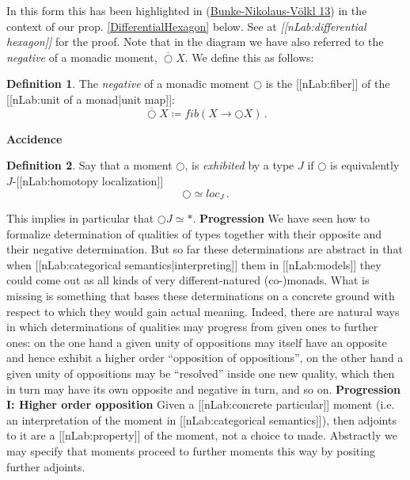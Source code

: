 \documentclass[12pt,titlepage]{article}
\theoremstyle{plain}
\theoremstyle{definition}
\newtheorem{defn}{Definition}
\theoremstyle{remark}
\begin{document}
In this form this has been highlighted in (\hyperlink{BunkeNikolausVoelkl13}{Bunke-Nikolaus-Völkl 13}) in the context of our prop. \ref{DifferentialHexagon} below. See at \emph{[[nLab:differential hexagon]]} for the proof.
Note that in the diagram we have also referred to the \emph{negative} of a monadic moment, $\overline{\bigcirc} X$. We define this as follows:
\begin{defn}
\label{NegativeMonadicMoment}\hypertarget{NegativeMonadicMoment}{}
The \emph{negative} of a monadic moment $\bigcirc$ is the [[nLab:fiber]] of the [[nLab:unit of a monad|unit map]]:
\begin{displaymath}
\overline{\bigcirc} X \coloneqq fib(X \to \bigcirc X)
  \,.
\end{displaymath}
\end{defn}
\textbf{Accidence}
\begin{defn}
\label{Localization}\hypertarget{Localization}{}
Say that a moment $\bigcirc$, is \emph{exhibited} by a type $J$ if $\bigcirc$ is equivalently $J$-[[nLab:homotopy localization]]
\begin{displaymath}
\bigcirc \simeq loc_{J}
  \,.
\end{displaymath}
\end{defn}
This implies in particular that $\bigcirc J \simeq \ast$.
\textbf{Progression}
We have seen how to formalize determination of qualities of types together with their opposite and their negative determination. But so far these determinations are abstract in that when [[nLab:categorical semantics|interpreting]] them in [[nLab:models]] they could come out as all kinds of very different-natured (co-)monads. What is missing is something that bases these determinations on a concrete ground with respect to which they would gain actual meaning.
Indeed, there are natural ways in which determinations of qualities may progress from given ones to further ones: on the one hand a given unity of oppositions may itself have an opposite and hence exhibit a higher order ``opposition of oppositions'', on the other hand a given unity of oppositions may be ``resolved'' inside one new quality, which then in turn may have its own opposite and negative in turn, and so on.
\textbf{Progression I: Higher order opposition}
Given a [[nLab:concrete particular]] moment (i.e. an interpretation of the moment in [[nLab:categorical semantics]]), then adjoints to it are a [[nLab:property]] of the moment, not a choice to made. Abstractly we may specify that moments proceed to further moments this way by positing further adjoints.
\end{document}
